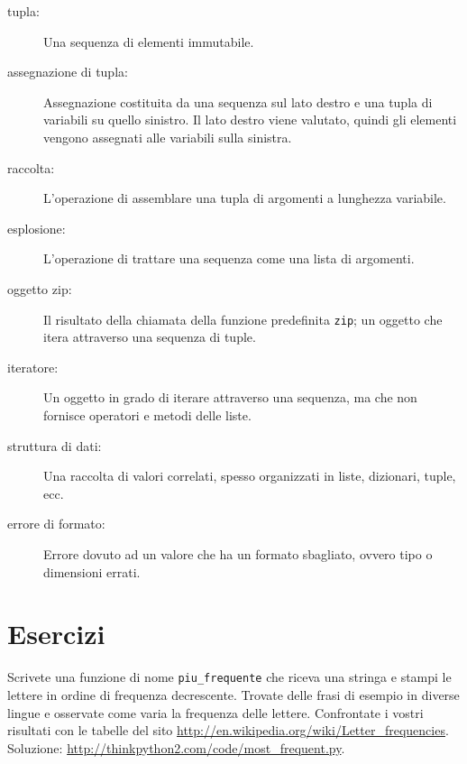 \documentclass[10pt]{book}
\begin{document}
\begin{description}

\item[tupla:] Una sequenza di elementi immutabile.

\item[assegnazione di tupla:] Assegnazione costituita da una sequenza sul lato destro e una tupla di variabili su quello sinistro. Il lato destro viene valutato, quindi gli elementi vengono assegnati alle variabili sulla sinistra.

\item[raccolta:] L'operazione di assemblare una tupla di argomenti a lunghezza variabile.

\item[esplosione:] L'operazione di trattare una sequenza come una lista di argomenti.

\item[oggetto zip:] Il risultato della chiamata della funzione predefinita {\tt zip}; un oggetto che itera attraverso una sequenza di tuple.

\item[iteratore:] Un oggetto in grado di iterare attraverso una sequenza, ma che non fornisce operatori e metodi delle liste.

\item[struttura di dati:] Una raccolta di valori correlati, spesso organizzati in liste, dizionari, tuple, ecc.

\item[errore di formato:] Errore dovuto ad un valore che ha un formato sbagliato, ovvero tipo o dimensioni errati.

\end{description}


\section{Esercizi}

\begin{exercise}

Scrivete una funzione di nome \verb"piu_frequente" che riceva una stringa e stampi le lettere in ordine di frequenza decrescente. Trovate delle frasi di esempio in diverse lingue e osservate come varia la frequenza delle lettere. Confrontate i vostri risultati con le tabelle del sito
\url{http://en.wikipedia.org/wiki/Letter_frequencies}.  Soluzione:
\url{http://thinkpython2.com/code/most_frequent.py}.  

\end{exercise}
\end{document}
